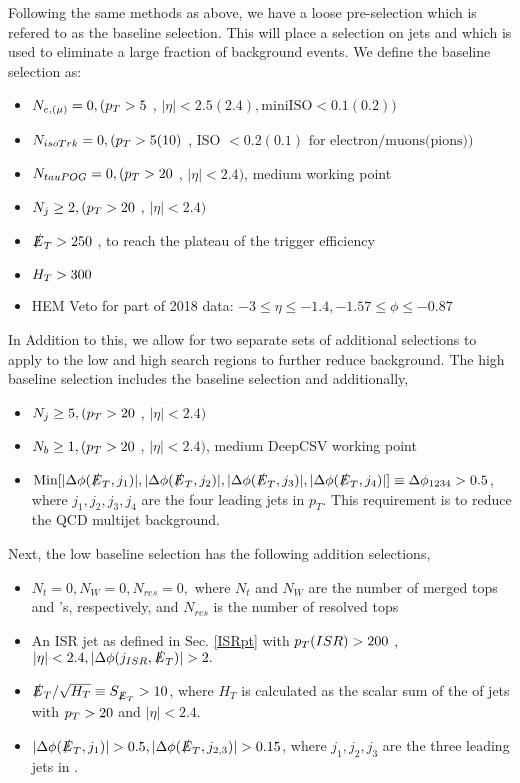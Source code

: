 Following the same methods as above, we have a loose pre-selection which is refered to as the baseline selection. This will place a selection on jets and \met which is used to eliminate a large fraction of background events. We define the baseline selection as:
\begin{itemize}
	\item $N_{e,(\mu)} = 0, (p_{T}>5$ \GeV, $|\eta|<2.5(2.4), \text{miniISO}<0.1(0.2))$
	\item $N_{isoTrk} = 0, (p_{T} > 5 (10)$ \GeV, ISO $< 0.2(0.1) \text{ for electron/muons(pions)})$
	\item $N_{tauPOG} = 0, (p_{T} > 20$ \GeV, $|\eta|<2.4)$, medium working point
	\item $N_{j} \geq 2, (p_{T} >20$ \GeV, $|\eta|<2.4)$
	\item $\slashed{E}_{T} >250$ \GeV, to reach the plateau of the trigger efficiency
	\item $H_{T}>300$ \GeV
	\item HEM Veto for part of 2018 data: $-3\leq\eta\leq-1.4, -1.57\leq\phi\leq-0.87$
\end{itemize}
In Addition to this, we allow for two separate sets of additional selections to apply to the low and high \dm{} search regions to further reduce background. The high \dm{} baseline selection includes the baseline selection and additionally,
\begin{itemize}
	\item $N_j\geq 5, (p_{T} >20$ \GeV, $|\eta|<2.4)$
	\item $N_b\geq 1, (p_{T} >20$ \GeV, $|\eta|<2.4)$, medium DeepCSV working point
	\item $\text{Min}[|\Delta\phi(\slashed{E}_{T},j_1)|,|\Delta\phi(\slashed{E}_{T},j_2)|,|\Delta\phi(\slashed{E}_{T},j_3)|,|\Delta\phi(\slashed{E}_{T},j_4)|]\equiv\Delta\phi_{1234}>0.5$, where $j_1, j_2, j_3, j_4$ are the four leading jets in $p_T$. This requirement is to reduce the QCD multijet background. 
\end{itemize}
Next, the low \dm{} baseline selection has the following addition selections,
\begin{itemize}
	\item $N_t=0, N_W=0,N_{res}=0,$ where $N_t$ and $N_W$ are the number of merged tops and \W's, respectively, and $N_{res}$ is the number of resolved tops
	\item An ISR jet as defined in Sec. \ref{ISRpt} with $p_{T}(ISR)>200$ \GeV, $|\eta|<2.4, |\Delta\phi(j_{ISR},\met)|>2.$
	\item $\slashed{E}_{T}/\sqrt{H_{T}}\equiv S_{\slashed{E}_{T}}>10$, where $H_T$ is calculated as the scalar sum of the \pt of jets with $p_{T} >20$ \GeV{} and $|\eta|<2.4.$
	\item $|\Delta\phi(\met,j_1)|>0.5, |\Delta\phi(\met,j_{2,3})|>0.15$, where $j_1,j_2,j_3$ are the three leading jets in \pt. 
\end{itemize}

